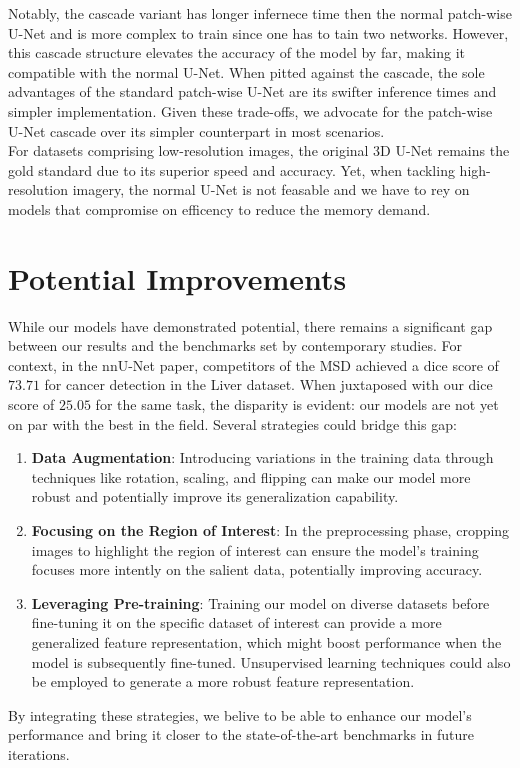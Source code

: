 Notably, the cascade variant has longer infernece time then the normal patch-wise U-Net and is more complex to train since one has to tain two networks. However,
this cascade structure elevates the accuracy of the model by far, making it compatible with the normal U-Net. When pitted against the cascade,
the sole advantages of the standard patch-wise U-Net are its swifter inference times and simpler implementation. Given these trade-offs,
we advocate for the patch-wise U-Net cascade over its simpler counterpart in most scenarios.\\[1ex]
For datasets comprising low-resolution images, the original 3D U-Net remains the gold standard due to its superior speed and accuracy.
Yet, when tackling high-resolution imagery, the normal U-Net is not feasable and we have to rey on models that compromise on efficency to reduce the memory demand.

\section{Potential Improvements}
While our models have demonstrated potential, there remains a significant gap between our results and the benchmarks set by contemporary studies.
For context, in the nnU-Net paper, competitors of the MSD achieved a dice score of $73.71$ for cancer detection in the Liver dataset.\cite[9]{isensee_nnu-net_2018}
When juxtaposed with our dice score of $25.05$ for the same task, the disparity is evident: our models are not yet on par with the best in the field.
Several strategies could bridge this gap:
\begin{enumerate}
	\item \textbf{Data Augmentation}: Introducing variations in the training data through techniques like rotation, scaling, and flipping can make our model more robust and potentially improve its generalization capability.
	\item \textbf{Focusing on the Region of Interest}: In the preprocessing phase, cropping images to highlight the region of interest can ensure the model's training focuses more intently on the salient data, potentially improving accuracy.
	\item \textbf{Leveraging Pre-training}: Training our model on diverse datasets before fine-tuning it on the specific dataset of interest can provide a more generalized feature representation,
	which might boost performance when the model is subsequently fine-tuned. Unsupervised learning techniques could also be employed to generate a more robust feature representation.
\end{enumerate}
By integrating these strategies, we belive to be able to enhance our model's performance and bring it closer to the state-of-the-art benchmarks in future iterations.

